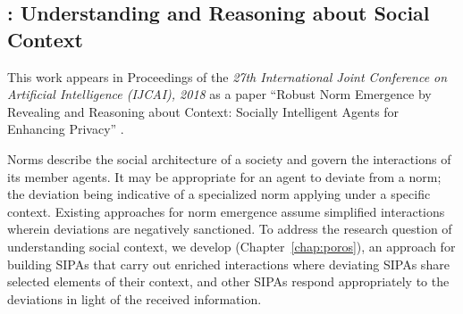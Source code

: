 \subsection[Understanding Social Context]{\frameworkB: Understanding and Reasoning about Social Context}

This work appears in Proceedings of the \emph{27th International Joint Conference on Artificial Intelligence (IJCAI), 2018}
as a paper ``Robust Norm Emergence by Revealing and Reasoning about Context: Socially Intelligent Agents for Enhancing Privacy'' \citep{IJCAI-18:Poros}.



Norms describe the social architecture of a society
and govern the interactions of its member agents.
It may be appropriate for an agent to deviate from
a norm; the deviation being indicative of a specialized
norm applying under a specific context. Existing
approaches for norm emergence assume simplified
interactions wherein deviations are negatively
sanctioned. To address the research question of understanding
social context, we develop \frameworkB (Chapter~\ref{chap:poros}), an approach for
building SIPAs that carry out enriched interactions
where deviating SIPAs share selected elements of their 
context, and other SIPAs respond appropriately to the deviations in light of the received information.

